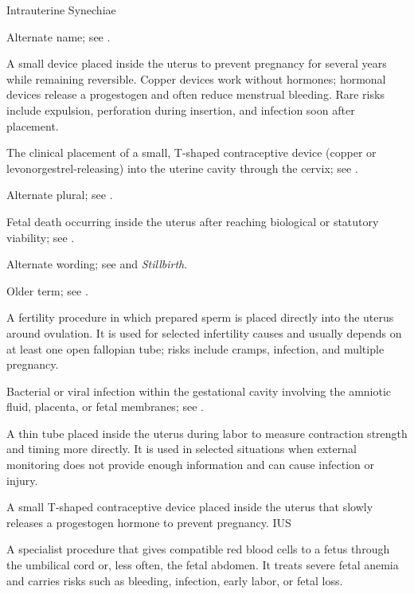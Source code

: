 \synonyms
Intrauterine Synechiae

 Alternate name; see .

 A small device placed inside the uterus to prevent pregnancy for several years while remaining reversible. Copper devices work without hormones; hormonal devices release a progestogen and often reduce menstrual bleeding. Rare risks include expulsion, perforation during insertion, and infection soon after placement.

 The clinical placement of a small, T-shaped contraceptive device (copper or levonorgestrel-releasing) into the uterine cavity through the cervix; see .

 Alternate plural; see .

 Fetal death occurring inside the uterus after reaching biological or statutory viability; see .

 Alternate wording; see  and \textit{Stillbirth}.

 Older term; see .

 A fertility procedure in which prepared sperm is placed directly into the uterus around ovulation. It is used for selected infertility causes and usually depends on at least one open fallopian tube; risks include cramps, infection, and multiple pregnancy.

 Bacterial or viral infection within the gestational cavity involving the amniotic fluid, placenta, or fetal membranes; see .

 A thin tube placed inside the uterus during labor to measure contraction strength and timing more directly. It is used in selected situations when external monitoring does not provide enough information and can cause infection or injury.

 A small T-shaped contraceptive device placed inside the uterus that slowly releases a progestogen hormone to prevent pregnancy.
\synonyms
IUS

 A specialist procedure that gives compatible red blood cells to a fetus through the umbilical cord or, less often, the fetal abdomen. It treats severe fetal anemia and carries risks such as bleeding, infection, early labor, or fetal loss.

